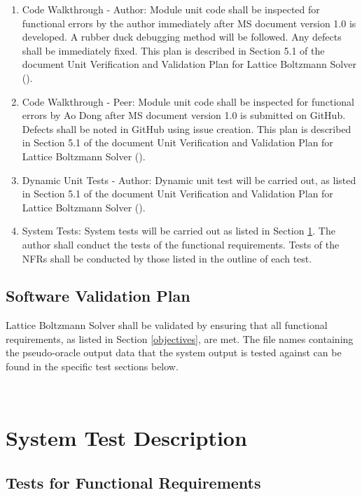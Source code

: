 \documentclass[12pt, titlepage]{article}
\newcommand{\myprogname}{Lattice Boltzmann Solver}
\begin{document}
\begin{enumerate}
\item Code Walkthrough - Author: Module unit code shall be inspected for functional errors by the author immediately after MS document version 1.0 is developed. A rubber duck debugging method will be followed. Any defects shall be immediately fixed. This plan is described in Section 5.1 of the document Unit Verification and Validation Plan for Lattice Boltzmann Solver (\citet{LBM_UVNV_PM}).
\item Code Walkthrough - Peer: Module unit code shall be inspected for functional errors by Ao Dong after MS document version 1.0 is submitted on GitHub. Defects shall be noted in GitHub using issue creation. This plan is described in Section 5.1 of the document Unit Verification and Validation Plan for Lattice Boltzmann Solver (\citet{LBM_UVNV_PM}).
\item Dynamic Unit Tests - Author: Dynamic unit test will be carried out, as listed in Section 5.1 of the document Unit Verification and Validation Plan for Lattice Boltzmann Solver (\citet{LBM_UVNV_PM}).
\item System Tests: System tests will be carried out as listed in Section \ref{systest}. The author shall conduct the tests of the functional requirements. Tests of the NFRs shall be conducted by those listed in the outline of each test.
\end{enumerate}



\subsection{Software Validation Plan}

{\myprogname} shall be validated by ensuring that all functional requirements, as listed in Section \ref{objectives}, are met. The file names containing the pseudo-oracle output data that the system output is tested against can be found in the specific test sections below.


~\newpage	 


\section{System Test Description}

\label{systest}


\subsection{Tests for Functional Requirements}
\end{document}
